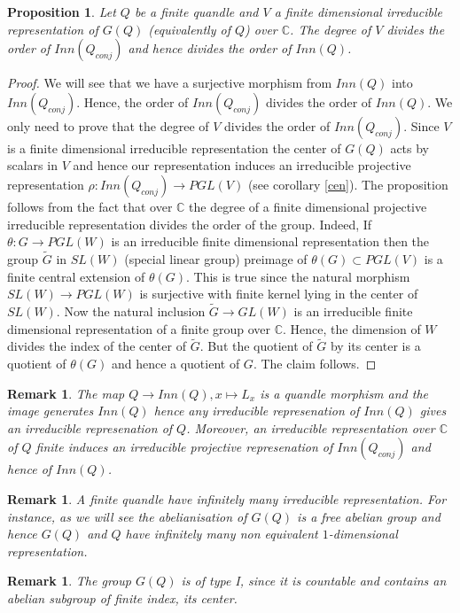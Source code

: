 \documentclass[12pt, reqno]{amsart}
\newtheorem{proposition}[theorem]{Proposition}
\newtheorem{remark}[theorem]{Remark}
\newcommand{\C}{ {\mathbb C} }
\begin{document}
\begin{proposition}
Let $Q$ be a finite quandle and $V$ a finite dimensional irreducible representation of $G(Q)$ (equivalently of $Q$) over $\C$. The degree of $V$ divides the order of $Inn(Q_{conj})$ and hence divides the order of $Inn(Q)$.
\end{proposition}
\begin{proof}
We will see that we have a surjective morphism from $Inn(Q)$ into $Inn(Q_{conj})$. Hence, the order of $Inn(Q_{conj})$ divides the order of $Inn(Q)$. We only need to prove that the degree of $V$ divides the order of $Inn(Q_{conj})$. Since $V$ is a finite dimensional irreducible representation the center of $G(Q)$ acts by scalars in $V$ and hence our representation induces an irreducible projective representation $\rho : Inn(Q_{conj}) \to PGL(V)$ (see corollary \ref{cen}). The proposition follows from the fact that over $\C$ the degree of a finite dimensional projective irreducible representation divides the order of the group. Indeed, If $\theta : G \to PGL(W)$ is an irreducible finite dimensional representation then the group $\tilde{G}$ in $SL(W)$ (special linear group) preimage of $\theta(G) \subset PGL(V)$ is a finite central extension of $\theta(G)$. This is true since the natural morphism $SL(W)\to PGL(W)$ is surjective with finite kernel lying in the center of $SL(W)$. Now the natural inclusion $\tilde{G}\to GL(W)$ is an irreducible finite dimensional representation of a finite group over 
$\C$. Hence, the dimension of $W$ divides the index of the center of $\tilde{G}$. But the quotient of $\tilde{G}$ by its center is a quotient of $\theta(G)$ and hence a quotient of $G$. The claim follows.
\end{proof}
\begin{remark}
The map $Q\to Inn(Q),x\mapsto L_x$ is a quandle morphism and the image generates $Inn(Q)$ hence any irreducible represenation of $Inn(Q)$ gives an irreducible represenation of $Q$. Moreover, an irreducible representation over $\C$ of $Q$ finite induces an irreducible projective represenation of $Inn(Q_{conj})$ and hence of $Inn(Q)$.
\end{remark}
\begin{remark}
A finite quandle have infinitely many irreducible representation. For instance, as we will see the abelianisation of $G(Q)$ is a free abelian group and hence $G(Q)$ and $Q$ have infinitely many non equivalent $1$-dimensional representation. 
\end{remark}
\begin{remark}
The group $G(Q)$ is of type I, since it is countable and contains an abelian subgroup of finite index, its center.
\end{remark}
\end{document}
